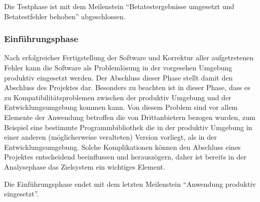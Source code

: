 Die Testphase ist mit dem Meilenstein "`Betatestergebnisse umgesetzt und
Betatestfehler behoben"' abgeschlossen.

\subsubsection{Einführungsphase}
\label{sec:Einführungsphase}

Nach erfolgreicher Fertigstellung der Software und Korrektur aller
aufgetretenen Fehler kann die Software als Problemlösung in der vorgesehen
Umgebung produktiv eingesetzt werden. Der Abschluss dieser Phase stellt damit
den Abschluss des Projektes dar. Besonders zu beachten ist in dieser Phase,
dass es zu Kompatibilitätsproblemen zwischen der produktiv Umgebung und der
Entwicklungsumgebung kommen kann. Von diesem Problem sind vor allem Elemente
der Anwendung betroffen die von Drittanbietern bezogen wurden, zum Beispiel
eine bestimmte Programmbibliothek die in der produktiv Umgebung in einer
anderen (möglicherweise veralteten) Version vorliegt, als in der
Entwicklungsumgebung. Solche Komplikationen können den Abschluss eines
Projektes entscheidend beeinflussen und herauszögern, daher ist bereits in der
Analysephase das Zielsystem ein wichtiges Element.

Die Einführungsphase endet mit dem letzten Meilenstein "`Anwendung produktiv
eingesetzt"'.

